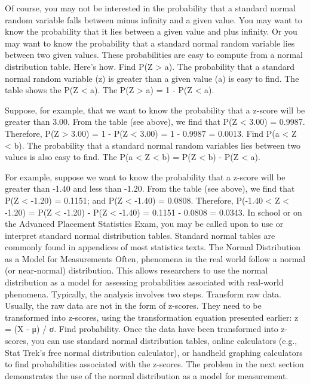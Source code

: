 Of course, you may not be interested in the probability that a standard normal random variable falls between minus infinity and a given value. You may want to know the probability that it lies between a given value and plus infinity. Or you may want to know the probability that a standard normal random variable lies between two given values. These probabilities are easy to compute from a normal distribution table. Here's how.
Find P(Z > a). The probability that a standard normal random variable (z) is greater than a given value (a) is easy to find. The table shows the P(Z < a). The P(Z > a) = 1 - P(Z < a). 

Suppose, for example, that we want to know the probability that a z-score will be greater than 3.00. From the table (see above), we find that P(Z < 3.00) = 0.9987. Therefore, P(Z > 3.00) = 1 - P(Z < 3.00) = 1 - 0.9987 = 0.0013. 
Find P(a < Z < b). The probability that a standard normal random variables lies between two values is also easy to find. The P(a < Z < b) = P(Z < b) - P(Z < a). 

For example, suppose we want to know the probability that a z-score will be greater than -1.40 and less than -1.20. From the table (see above), we find that P(Z < -1.20) = 0.1151; and P(Z < -1.40) = 0.0808. Therefore, P(-1.40 < Z < -1.20) = P(Z < -1.20) - P(Z < -1.40) = 0.1151 - 0.0808 = 0.0343.
In school or on the Advanced Placement Statistics Exam, you may be called upon to use or interpret standard normal distribution tables. Standard normal tables are commonly found in appendices of most statistics texts.
The Normal Distribution as a Model for Measurements
Often, phenomena in the real world follow a normal (or near-normal) distribution. This allows researchers to use the normal distribution as a model for assessing probabilities associated with real-world phenomena. Typically, the analysis involves two steps.
Transform raw data. Usually, the raw data are not in the form of z-scores. They need to be transformed into z-scores, using the transformation equation presented earlier: z = (X - μ) / σ.
Find probability. Once the data have been transformed into z-scores, you can use standard normal distribution tables, online calculators (e.g., Stat Trek's free normal distribution calculator), or handheld graphing calculators to find probabilities associated with the z-scores.
The problem in the next section demonstrates the use of the normal distribution as a model for measurement.



 
 
